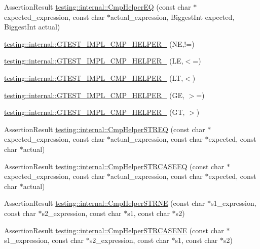 \begin{DoxyCompactItemize}
\item 
Assertion\-Result \hyperlink{namespacetesting_1_1internal_ae82c79cea2973bbbfbd0f2aca7a6f349}{testing\-::internal\-::\-Cmp\-Helper\-E\-Q} (const char $\ast$expected\-\_\-expression, const char $\ast$actual\-\_\-expression, Biggest\-Int expected, Biggest\-Int actual)
\item 
\hyperlink{namespacetesting_1_1internal_aa3a0659f0e495c276d69bc9beddb268a}{testing\-::internal\-::\-G\-T\-E\-S\-T\-\_\-\-I\-M\-P\-L\-\_\-\-C\-M\-P\-\_\-\-H\-E\-L\-P\-E\-R\-\_\-} (N\-E,!=)
\item 
\hyperlink{namespacetesting_1_1internal_ade60646b18728043fff84d7b4125de2c}{testing\-::internal\-::\-G\-T\-E\-S\-T\-\_\-\-I\-M\-P\-L\-\_\-\-C\-M\-P\-\_\-\-H\-E\-L\-P\-E\-R\-\_\-} (L\-E,$<$=)
\item 
\hyperlink{namespacetesting_1_1internal_aabcbff15eac496f8487699d19f42c274}{testing\-::internal\-::\-G\-T\-E\-S\-T\-\_\-\-I\-M\-P\-L\-\_\-\-C\-M\-P\-\_\-\-H\-E\-L\-P\-E\-R\-\_\-} (L\-T,$<$)
\item 
\hyperlink{namespacetesting_1_1internal_af969886067930ce70f6405cd5aa8b06b}{testing\-::internal\-::\-G\-T\-E\-S\-T\-\_\-\-I\-M\-P\-L\-\_\-\-C\-M\-P\-\_\-\-H\-E\-L\-P\-E\-R\-\_\-} (G\-E, $>$=)
\item 
\hyperlink{namespacetesting_1_1internal_a7fdb4fc164db83c51dfad17640bfeae9}{testing\-::internal\-::\-G\-T\-E\-S\-T\-\_\-\-I\-M\-P\-L\-\_\-\-C\-M\-P\-\_\-\-H\-E\-L\-P\-E\-R\-\_\-} (G\-T, $>$)
\item 
Assertion\-Result \hyperlink{namespacetesting_1_1internal_a11ff4bc46dddd8bb07c0e247a603695d}{testing\-::internal\-::\-Cmp\-Helper\-S\-T\-R\-E\-Q} (const char $\ast$expected\-\_\-expression, const char $\ast$actual\-\_\-expression, const char $\ast$expected, const char $\ast$actual)
\item 
Assertion\-Result \hyperlink{namespacetesting_1_1internal_a802d9586d870a90e6a850953c167654d}{testing\-::internal\-::\-Cmp\-Helper\-S\-T\-R\-C\-A\-S\-E\-E\-Q} (const char $\ast$expected\-\_\-expression, const char $\ast$actual\-\_\-expression, const char $\ast$expected, const char $\ast$actual)
\item 
Assertion\-Result \hyperlink{namespacetesting_1_1internal_af2d31c77ce73e1003a64bd7ca3564bbe}{testing\-::internal\-::\-Cmp\-Helper\-S\-T\-R\-N\-E} (const char $\ast$s1\-\_\-expression, const char $\ast$s2\-\_\-expression, const char $\ast$s1, const char $\ast$s2)
\item 
Assertion\-Result \hyperlink{namespacetesting_1_1internal_a7e31d489f06ab8f6a81a7729f0c377e7}{testing\-::internal\-::\-Cmp\-Helper\-S\-T\-R\-C\-A\-S\-E\-N\-E} (const char $\ast$s1\-\_\-expression, const char $\ast$s2\-\_\-expression, const char $\ast$s1, const char $\ast$s2)

\end{DoxyCompactItemize}
